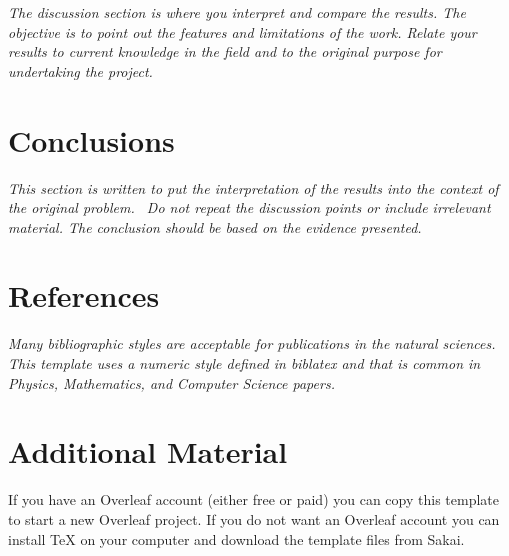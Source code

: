 \documentclass[11pt,a4paper,oneside]{report}
\newcommand{\instructions}[1]{{\color{black}\itshape #1}}
\begin{document}
\instructions{The discussion section is where you interpret and compare the
results. The objective is to point out the features and limitations of
the work. Relate your results to current knowledge in the field and to
the original purpose for undertaking the project.}


\chapter{Conclusions}
\label{conclusions}

\instructions{This section is written to put the interpretation of the results
into the context of the original problem.~ Do not repeat the discussion
points or include irrelevant material. The conclusion should be based on
the evidence presented.}


\chapter*{References}
\label{references}


\instructions{Many bibliographic styles are acceptable for publications 
in the natural sciences. This template uses a numeric style defined in biblatex
and that is common in Physics, Mathematics, and Computer Science papers.}

\printbibliography[heading=none]


\appendix

\chapter{Additional Material}
\label{appendix-a}

If you have an Overleaf account (either free or paid) you can copy this template to start a new Overleaf project.
If you do not want an Overleaf account you can install TeX on your computer and download the template files from Sakai.
\end{document}
